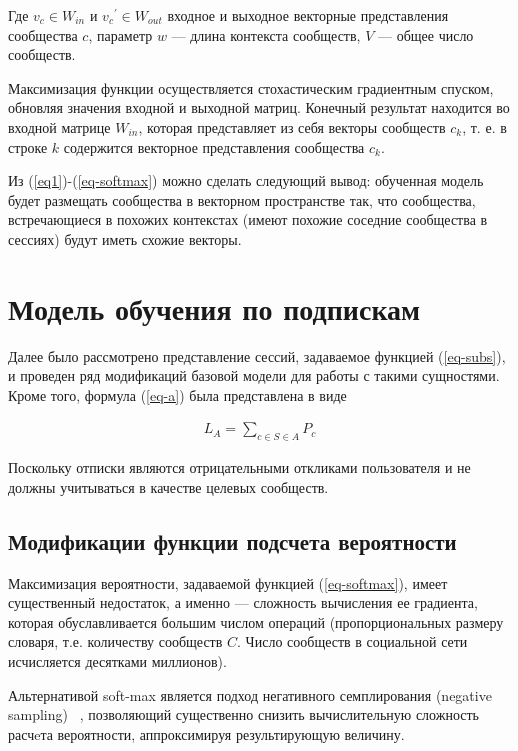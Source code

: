 \documentclass[times,specification,annotation]{itmo-student-thesis}
\begin{document}
Где ${v_c}\in W_{in}$ и ${v_c}^{'} \in W_{out}$ входное и выходное векторные представления сообщества $c$, параметр $w$ --- длина контекста сообществ, $V$ --- общее число сообществ. 

Максимизация функции осуществляется стохастическим градиентным спуском, обновляя значения входной и выходной матриц. Конечный результат находится во входной матрице $W_{in}$, которая представляет из себя векторы сообществ $c_k$, т. е. в строке $k$ содержится векторное
представления сообщества $c_k$.

Из (\ref{eq1})-(\ref{eq-softmax}) можно сделать следующий вывод: обученная модель будет размещать сообщества в векторном пространстве так, что сообщества, встречающиеся в похожих контекстах (имеют похожие соседние сообщества в сессиях) будут иметь схожие векторы.  

\section{Модель обучения по подпискам}\label{sec:algo-subs}
Далее было рассмотрено представление сессий, задаваемое функцией (\ref{eq-subs}), и проведен ряд модификаций базовой модели для работы с такими сущностями. Кроме того, формула (\ref{eq-a}) была представлена в виде

\begin{align}
L_A = \sum_{c \in S \in A} P_c
\label{eq-a-mod}
\end{align}

Поскольку отписки являются отрицательными откликами пользователя и не должны учитываться в качестве целевых сообществ.
 
\subsection{Модификации функции подсчета вероятности }\label{sec:prob}
Максимизация вероятности, задаваемой функцией
(\ref{eq-softmax}), имеет существенный недостаток, а именно --- сложность вычисления ее градиента, которая обуславливается большим числом операций (пропорциональных размеру словаря, т.е. количеству сообществ $C$. Число сообществ в социальной сети исчисляется десятками миллионов).

Альтернативой soft-max является подход негативного семплирования (negative sampling) ~\cite{mikolov2013distributed}, позволяющий существенно снизить вычислительную сложность расчeта вероятности, аппроксимируя результирующую величину.
\end{document}
